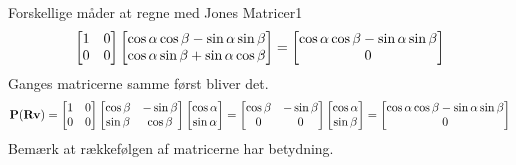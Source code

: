 \begin{opgave}{Forskellige måder at regne med Jones Matricer}{1}
$$\begin{bmatrix}
1&0\\0&0
\end{bmatrix}
\begin{bmatrix} \cos\alpha\cos\beta-\sin\alpha\sin\beta \\ \cos\alpha\sin\beta+\sin\alpha\cos\beta \end{bmatrix}=
\begin{bmatrix} \cos\alpha\cos\beta-\sin\alpha\sin\beta \\ 0 \end{bmatrix}
$$
Ganges matricerne samme først bliver det.
$$
\mathbf{P}(\mathbf{R} \mathbf{v} ) = 
\begin{bmatrix}
1&0\\0&0
\end{bmatrix}
\begin{bmatrix}
\cos\beta & -\sin\beta\\\sin\beta&\cos\beta
\end{bmatrix}
\begin{bmatrix} \cos\alpha \\ \sin\alpha \end{bmatrix}=
\begin{bmatrix}
\cos\beta&-\sin\beta\\
0&0
\end{bmatrix}
\begin{bmatrix} \cos\alpha \\ \sin\beta \end{bmatrix}
=
\begin{bmatrix} \cos\alpha\cos\beta-\sin\alpha\sin\beta \\ 0 \end{bmatrix}
$$
Bemærk at rækkefølgen af matricerne har betydning.
\end{opgave}

